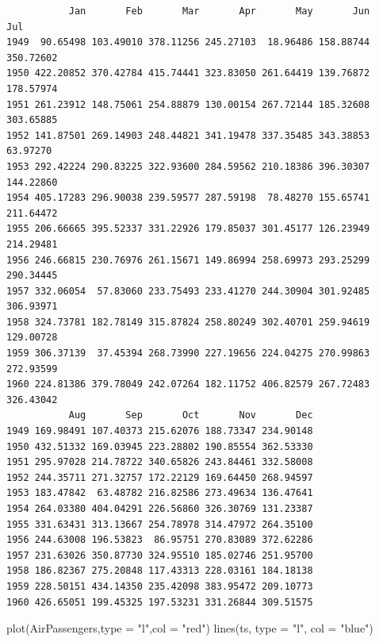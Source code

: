 \documentclass[
  letterpaper,
  DIV=11,
  numbers=noendperiod]{scrreprt}
\newenvironment{Shaded}{\begin{snugshade}}{\end{snugshade}}
\newcommand{\AttributeTok}[1]{\textcolor[rgb]{0.40,0.45,0.13}{#1}}
\newcommand{\FunctionTok}[1]{\textcolor[rgb]{0.28,0.35,0.67}{#1}}
\newcommand{\NormalTok}[1]{\textcolor[rgb]{0.00,0.23,0.31}{#1}}
\newcommand{\StringTok}[1]{\textcolor[rgb]{0.13,0.47,0.30}{#1}}
\begin{document}
\begin{verbatim}
           Jan       Feb       Mar       Apr       May       Jun       Jul
1949  90.65498 103.49010 378.11256 245.27103  18.96486 158.88744 350.72602
1950 422.20852 370.42784 415.74441 323.83050 261.64419 139.76872 178.57974
1951 261.23912 148.75061 254.88879 130.00154 267.72144 185.32608 303.65885
1952 141.87501 269.14903 248.44821 341.19478 337.35485 343.38853  63.97270
1953 292.42224 290.83225 322.93600 284.59562 210.18386 396.30307 144.22860
1954 405.17283 296.90038 239.59577 287.59198  78.48270 155.65741 211.64472
1955 206.66665 395.52337 331.22926 179.85037 301.45177 126.23949 214.29481
1956 246.66815 230.76976 261.15671 149.86994 258.69973 293.25299 290.34445
1957 332.06054  57.83060 233.75493 233.41270 244.30904 301.92485 306.93971
1958 324.73781 182.78149 315.87824 258.80249 302.40701 259.94619 129.00728
1959 306.37139  37.45394 268.73990 227.19656 224.04275 270.99863 272.93599
1960 224.81386 379.78049 242.07264 182.11752 406.82579 267.72483 326.43042
           Aug       Sep       Oct       Nov       Dec
1949 169.98491 107.40373 215.62076 188.73347 234.90148
1950 432.51332 169.03945 223.28802 190.85554 362.53330
1951 295.97028 214.78722 340.65826 243.84461 332.58008
1952 244.35711 271.32757 172.22129 169.64450 268.94597
1953 183.47842  63.48782 216.82586 273.49634 136.47641
1954 264.03380 404.04291 226.56860 326.30769 131.23387
1955 331.63431 313.13667 254.78978 314.47972 264.35100
1956 244.63008 196.53823  86.95751 270.83089 372.62286
1957 231.63026 350.87730 324.95510 185.02746 251.95700
1958 186.82367 275.20848 117.43313 228.03161 184.18138
1959 228.50151 434.14350 235.42098 383.95472 209.10773
1960 426.65051 199.45325 197.53231 331.26844 309.51575
\end{verbatim}

\begin{Shaded}
\begin{Highlighting}[]
\FunctionTok{plot}\NormalTok{(AirPassengers,}\AttributeTok{type =} \StringTok{"l"}\NormalTok{,}\AttributeTok{col =} \StringTok{"red"}\NormalTok{)}
\FunctionTok{lines}\NormalTok{(ts, }\AttributeTok{type =} \StringTok{"l"}\NormalTok{, }\AttributeTok{col =} \StringTok{"blue"}\NormalTok{)}
\end{Highlighting}
\end{Shaded}
\end{document}
